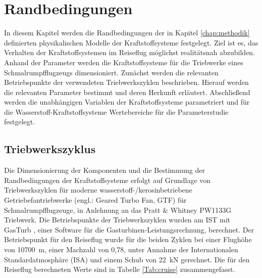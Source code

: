\chapter{Randbedingungen}
\label{chap:param}

In diesem Kapitel werden die Randbedingungen der in Kapitel \ref{chap:methodik} definierten physikalischen Modelle der Kraftstoffsysteme festgelegt. Ziel ist es, das Verhalten der Kraftstoffsystemen im Reiseflug möglichst realitätsnah abzubilden. Anhand der Parameter werden die Kraftstoffsysteme für die Triebwerke eines Schmalrumpfflugzeugs dimensioniert. Zunächst werden die relevanten Betriebspunkte der verwendeten Triebwerkszyklen beschrieben. Hierauf werden die relevanten Parameter bestimmt und deren Herkunft erläutert. Abschließend werden die unabhängigen Variablen der Kraftstoffsysteme parametriert und für die Wasserstoff-Kraftstoffsysteme Wertebereiche für die Parameterstudie festgelegt.

\section{Triebwerkszyklus}

Die Dimensionierung der Komponenten und die Bestimmung der Randbedingungen der Kraftstoffsysteme erfolgt auf Grundlage von Triebwerkszyklen für moderne wasserstoff-/kerosinbetriebene Getriebefantriebwerke (engl.: Geared Turbo Fan, GTF) für Schmalrumpfflugzeuge, in Anlehnung an das Pratt \& Whitney PW1133G Triebwerk. Die Betriebspunkte der Triebwerkszyklen wurden am IST mit GasTurb \cite{GasTurbGmbH.2021}, einer Software für die Gasturbinen-Leistungsrechnung, berechnet. Der Betriebspunkt für den Reiseflug wurde für die beiden Zyklen bei einer Flughöhe von \SI{10700}{\m}, einer Machzahl von 0,78, unter Annahme der Internationalen Standardatmosphäre (ISA) und einem Schub von \SI{22}{\kilo\N} gerechnet. Die für den Reiseflug berechneten Werte sind in Tabelle \ref{Tab:cruise} zusammengefasst.

